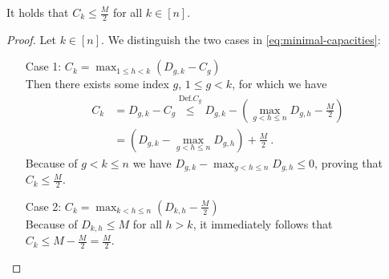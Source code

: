 \begin{lemma}
	\label{lemma:capacities-bounded}
	It holds that $C_k \leq \frac{M}{2}$ for all $k \in [n]$.
\end{lemma}
\begin{proof}
	Let $k \in [n]$.
	We distinguish the two cases in \cref{eq:minimal-capacities}:
	\begin{enumerate}[align=left]
		\item[Case 1: $C_k = \max_{1 \leq h < k}(D_{g, k} - C_g)$]{\mbox{}\\
			Then there exists some index $g$, $1 \leq g < k$, for which we have
			\begin{align}
				C_k &= D_{g, k} - C_g 
				\stackrel{\mathrm{Def. } C_g}{\leq} D_{g, k} - \left(\max_{g < h \leq n} D_{g,h} - \frac{M}{2}\right)\\
				&= (D_{g, k} - \max_{g < h \leq n} D_{g, h}) + \frac{M}{2} \ .
			\end{align}
			Because of $g < k \leq n$ we have $D_{g, k} - \max_{g < h \leq n} D_{g, h} \leq 0$, proving that $C_k \leq \frac{M}{2}$.
		}
		\item[Case 2: $C_k = \max_{k < h \leq n}(D_{k, h} - \frac{M}{2})$]{\mbox{}\\
			Because of $D_{k, h} \leq M$ for all $h > k$, it immediately follows that $C_k \leq M - \frac{M}{2} = \frac{M}{2}$.
		}
	\end{enumerate}
\end{proof}


